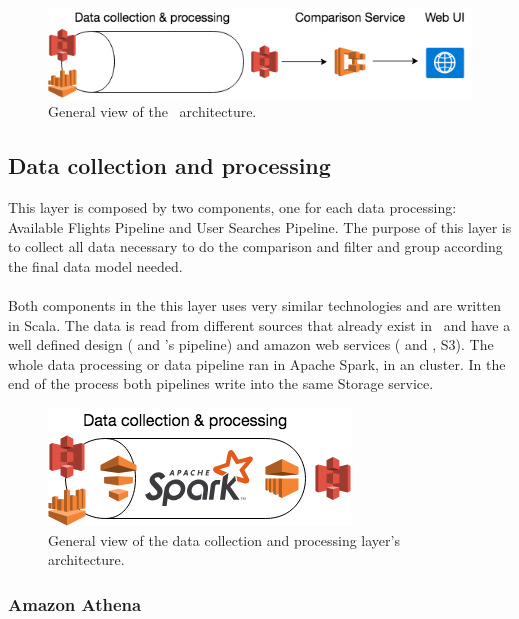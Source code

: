 \begin{figure}[H]
\centering
\includegraphics[scale=0.7]{diagrams/architecture01.png}
\caption{General view of the \thesis\ architecture.}
\end{figure}


\subsection{Data collection and processing} \label{data_layer}

This layer is composed by two components, one for each data processing: Available Flights Pipeline and User Searches Pipeline. The purpose of this layer is to collect all data necessary to do the comparison and filter and group according the final data model needed.
\\\\
Both components in the this layer uses very similar technologies and are written in Scala. The data is read from different sources that already exist in \company\ and have a well defined design ( and \squad's pipeline) and amazon web services ( and , S3). The whole data processing or data pipeline ran in Apache Spark, in an  cluster. In the end of the process both pipelines write into the same Storage service.

\begin{figure}[H]
\centering
\includegraphics[scale=0.7]{diagrams/architecture-data.png}
\caption{General view of the data collection and processing layer's architecture.}
\end{figure}

\subsubsection*{Amazon Athena} \label{athena}

